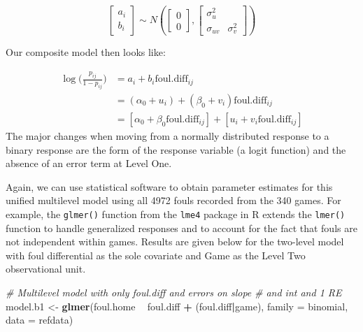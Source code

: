 \documentclass[
]{krantz}
\newenvironment{Shaded}{\begin{snugshade}}{\end{snugshade}}
\newcommand{\CommentTok}[1]{\textcolor[rgb]{0.37,0.37,0.37}{\textit{#1}}}
\newcommand{\DataTypeTok}[1]{\textcolor[rgb]{0.27,0.27,0.27}{#1}}
\newcommand{\KeywordTok}[1]{\textcolor[rgb]{0.27,0.27,0.27}{\textbf{#1}}}
\newcommand{\NormalTok}[1]{#1}
\newcommand{\OperatorTok}[1]{\textcolor[rgb]{0.43,0.43,0.43}{\textbf{#1}}}
\newcommand{\StringTok}[1]{\textcolor[rgb]{0.5,0.5,0.5}{#1}}
\begin{document}
\[ \left[ \begin{array}{c}
            a_i \\ b_i
          \end{array}  \right] \sim N \left( \left[
          \begin{array}{c}
            0 \\ 0
          \end{array} \right], \left[
          \begin{array}{cc}
            \sigma_{u}^{2} & \\
            \sigma_{uv} & \sigma_{v}^{2}
          \end{array} \right] \right) \]

Our composite model then looks like:

\begin{align*}
\log\bigg(\frac{p_{ij}}{1-p_{ij}}\bigg) & = a_i+b_i\mathrm{foul.diff}_{ij} \\
 & = (\alpha_{0}+u_i) + (\beta_{0}+v_i)\mathrm{foul.diff}_{ij} \\
 & = [\alpha_{0}+\beta_{0}\mathrm{foul.diff}_{ij}]+[u_i+v_i\mathrm{foul.diff}_{ij}]
\end{align*}
The major changes when moving from a normally distributed response to a binary response are the form of the response variable (a logit function) and the absence of an error term at Level One.

Again, we can use statistical software to obtain parameter estimates for this unified multilevel model using all 4972 fouls recorded from the 340 games. For example, the \texttt{glmer()} function from the \texttt{lme4} package in R extends the \texttt{lmer()} function to handle generalized responses and to account for the fact that fouls are not independent within games. Results are given below for the two-level model with foul differential as the sole covariate and Game as the Level Two observational unit.

\begin{Shaded}
\begin{Highlighting}[]
\CommentTok{# Multilevel model with only foul.diff and errors on slope }
\CommentTok{#   and int and 1 RE}
\NormalTok{model.b1 <-}\StringTok{ }\KeywordTok{glmer}\NormalTok{(foul.home }\OperatorTok{~}\StringTok{ }\NormalTok{foul.diff }\OperatorTok{+}\StringTok{ }\NormalTok{(foul.diff}\OperatorTok{|}\NormalTok{game),}
                  \DataTypeTok{family =}\NormalTok{ binomial, }\DataTypeTok{data =}\NormalTok{ refdata)}
\end{Highlighting}
\end{Shaded}
\end{document}
